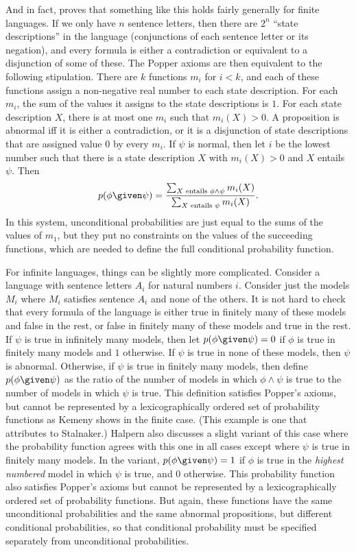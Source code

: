 And in fact, \citet{kemeny} proves that something like this holds fairly generally for finite languages. If we only have $n$ sentence letters, then there are $2^n$ ``state descriptions'' in the language (conjunctions of each sentence letter or its negation), and every formula is either a contradiction or equivalent to a disjunction of some of these. The Popper axioms are then equivalent to the following stipulation. There are $k$ functions $m_i$ for $i<k$, and each of these functions assign a non-negative real number to each state description. For each $m_i$, the sum of the values it assigns to the state descriptions is $1$. For each state description $X$, there is at most one $m_i$ such that $m_i(X)>0$. A proposition is abnormal iff it is either a contradiction, or it is a disjunction of state descriptions that are assigned value $0$ by every $m_i$. If $\psi$ is normal, then let $i$ be the lowest number such that there is a state description $X$ with $m_i(X)>0$ and $X$ entails $\psi$. Then
$$p(\phi \given \psi)=\frac{\sum_{X\textrm{ entails }\phi\land\psi}m_i(X)}{\sum_{X\textrm{ entails }\psi}m_i(X)}.$$
In this system, unconditional probabilities are just equal to the sums of the values of $m_1$, but they put no constraints on the values of the succeeding functions, which are needed to define the full conditional probability function. 

For infinite languages, things can be slightly more complicated. Consider a language with sentence letters $A_i$ for natural numbers $i$. Consider just the models $M_i$ where $M_i$ satisfies sentence $A_i$ and none of the others. It is not hard to check that every formula of the language is either true in finitely many of these models and false in the rest, or false in finitely many of these models and true in the rest. If $\psi$ is true in infinitely many models, then let $p(\phi \given \psi)=0$ if $\phi$ is true in finitely many models and $1$ otherwise. If $\psi$ is true in none of these models, then $\psi$ is abnormal. Otherwise, if $\psi$ is true in finitely many models, then define $p(\phi \given \psi)$ as the ratio of the number of models in which $\phi\land\psi$ is true to the number of models in which $\psi$ is true. This definition satisfies Popper's axioms, but cannot be represented by a lexicographically ordered set of probability functions as Kemeny shows in the finite case. (This example is one that \citealp{halpern} attributes to Stalnaker.) Halpern also discusses a slight variant of this case where the probability function agrees with this one in all cases except where $\psi$ is true in finitely many models. In the variant, $p(\phi \given \psi)=1$ if $\phi$ is true in the \emph{highest numbered} model in which $\psi$ is true, and $0$ otherwise. This probability function also satisfies Popper's axioms but cannot be represented by a lexicographically ordered set of probability functions. But again, these functions have the same unconditional probabilities and the same abnormal propositions, but different conditional probabilities, so that conditional probability must be specified separately from unconditional probabilities.

